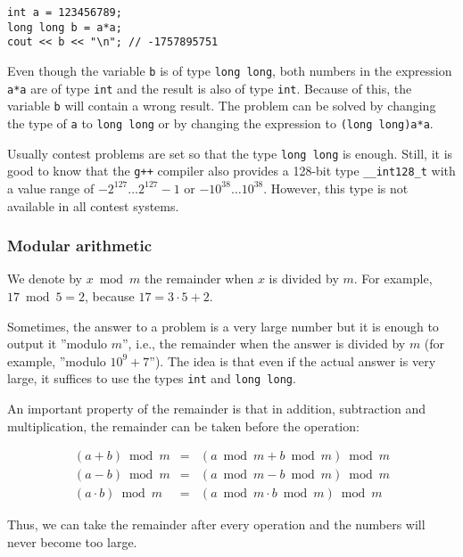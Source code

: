 \begin{lstlisting}
int a = 123456789;
long long b = a*a;
cout << b << "\n"; // -1757895751
\end{lstlisting}

Even though the variable \texttt{b} is of type \texttt{long long},
both numbers in the expression \texttt{a*a}
are of type \texttt{int} and the result is
also of type \texttt{int}.
Because of this, the variable \texttt{b} will
contain a wrong result.
The problem can be solved by changing the type
of \texttt{a} to \texttt{long long} or
by changing the expression to \texttt{(long long)a*a}.

Usually contest problems are set so that the
type \texttt{long long} is enough.
Still, it is good to know that
the \texttt{g++} compiler also provides
a 128-bit type \texttt{\_\_int128\_t}
with a value range of
$-2^{127} \ldots 2^{127}-1$ or $-10^{38} \ldots 10^{38}$.
However, this type is not available in all contest systems.

\subsubsection{Modular arithmetic}


We denote by $x \bmod m$ the remainder
when $x$ is divided by $m$.
For example, $17 \bmod 5 = 2$,
because $17 = 3 \cdot 5 + 2$.

Sometimes, the answer to a problem is a
very large number but it is enough to
output it ''modulo $m$'', i.e.,
the remainder when the answer is divided by $m$
(for example, ''modulo $10^9+7$'').
The idea is that even if the actual answer
is very large,
it suffices to use the types
\texttt{int} and \texttt{long long}.

An important property of the remainder is that
in addition, subtraction and multiplication,
the remainder can be taken before the operation:

\[
\begin{array}{rcr}
(a+b) \bmod m & = & (a \bmod m + b \bmod m) \bmod m \\
(a-b) \bmod m & = & (a \bmod m - b \bmod m) \bmod m \\
(a \cdot b) \bmod m & = & (a \bmod m \cdot b \bmod m) \bmod m
\end{array}
\]

Thus, we can take the remainder after every operation
and the numbers will never become too large.

